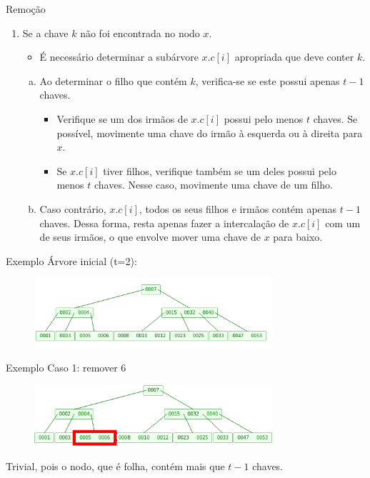 \documentclass[aspectratio=169]{beamer}
\begin{document}
{\begin{frame}{Remoção}
 \begin{enumerate}[(3)]
  \item Se a chave $k$ não foi encontrada no nodo $x$. 
  \begin{itemize}
    \item É necessário determinar a subárvore $x.c[i]$ apropriada que deve conter $k$.
  \end{itemize}
  \begin{enumerate}[(a)]
  \item Ao determinar o filho que contém $k$, verifica-se se este possui apenas $t-1$ chaves.
  \begin{itemize}
  \item Verifique se um dos irmãos de $x.c[i]$ possui pelo menos $t$ chaves. Se possível, movimente uma chave do irmão à esquerda ou à direita para $x$.
  \item Se  $x.c[i]$ tiver filhos, verifique também se um deles possui pelo menos $t$ chaves. Nesse caso, movimente uma chave de um filho.
  \end{itemize}
  \item Caso contrário, $x.c[i]$, todos os seus filhos e irmãos contém apenas $t-1$ chaves. Dessa forma, resta apenas fazer a intercalação de $x.c[i]$ com um de seus irmãos, o que envolve mover uma chave de $x$ para baixo.
  \end{enumerate} 
 \end{enumerate}
\end{frame}


\begin{frame}{Exemplo}
Árvore inicial (t=2):
\begin{figure}[!h]
\centering
   \includegraphics[width=250pt]{imagens/remocao1.png}
  \label{fig_remocao1}
\end{figure} 
\end{frame}



\begin{frame}{Exemplo}
Caso 1: remover 6
\begin{figure}[!h]
\centering
   \includegraphics[width=250pt]{imagens/remocao2.png}
  \label{fig_remocao2}
\end{figure} 
Trivial, pois o nodo, que é folha, contém mais que $t-1$ chaves.
\end{frame}

}
\end{document}
